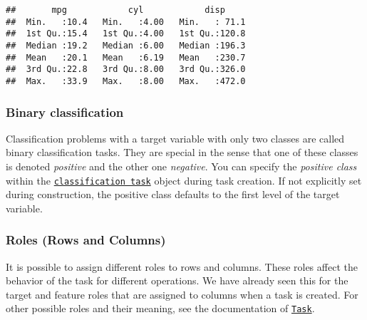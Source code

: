 \documentclass[
]{scrbook}
\newenvironment{Shaded}{\begin{snugshade}}{\end{snugshade}}
\newcommand{\AttributeTok}[1]{\textcolor[rgb]{0.77,0.63,0.00}{#1}}
\newcommand{\CommentTok}[1]{\textcolor[rgb]{0.56,0.35,0.01}{\textit{#1}}}
\newcommand{\FunctionTok}[1]{\textcolor[rgb]{0.00,0.00,0.00}{#1}}
\newcommand{\NormalTok}[1]{#1}
\newcommand{\OtherTok}[1]{\textcolor[rgb]{0.56,0.35,0.01}{#1}}
\newcommand{\SpecialCharTok}[1]{\textcolor[rgb]{0.00,0.00,0.00}{#1}}
\newcommand{\StringTok}[1]{\textcolor[rgb]{0.31,0.60,0.02}{#1}}
\renewenvironment{Shaded} {\begin{snugshade}\small} {\end{snugshade}}
\begin{document}
\begin{verbatim}
##       mpg            cyl            disp      
##  Min.   :10.4   Min.   :4.00   Min.   : 71.1  
##  1st Qu.:15.4   1st Qu.:4.00   1st Qu.:120.8  
##  Median :19.2   Median :6.00   Median :196.3  
##  Mean   :20.1   Mean   :6.19   Mean   :230.7  
##  3rd Qu.:22.8   3rd Qu.:8.00   3rd Qu.:326.0  
##  Max.   :33.9   Max.   :8.00   Max.   :472.0
\end{verbatim}

\hypertarget{binary-classification}{%
\subsubsection{Binary classification}\label{binary-classification}}

Classification problems with a target variable with only two classes are called binary classification tasks.
They are special in the sense that one of these classes is denoted \emph{positive} and the other one \emph{negative}.
You can specify the \emph{positive class} within the \href{https://mlr3.mlr-org.com/reference/TaskClassif.html}{\texttt{classification\ task}} object during task creation.
If not explicitly set during construction, the positive class defaults to the first level of the target variable.

\begin{Shaded}
\end{Shaded}

\hypertarget{tasks-roles}{%
\subsubsection{Roles (Rows and Columns)}\label{tasks-roles}}

It is possible to assign different roles to rows and columns.
These roles affect the behavior of the task for different operations.
We have already seen this for the target and feature roles that are assigned to columns when a task is created.
For other possible roles and their meaning, see the documentation of \href{https://mlr3.mlr-org.com/reference/Task.html}{\texttt{Task}}.
\end{document}
